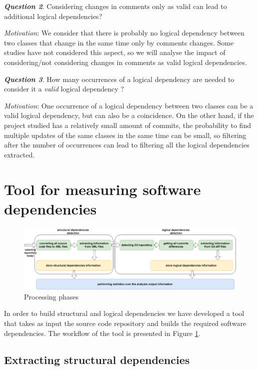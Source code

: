 \documentclass[conference]{IEEEtran}
\begin{document}
\textit{\textbf{Question 2}}. Considering changes in comments only as valid can lead to additional logical dependencies?

\textit{Motivation}: We consider that there is probably no logical dependency between two classes that change in the same time only by comments changes. Some studies have not considered this aspect, so we will analyse the impact of considering/not considering changes in comments as valid logical dependencies.

\textit{\textbf{Question 3}}. How many occurrences of a logical dependency are needed to consider it a \textit{valid} logical dependency ? 

\textit{Motivation}: One occurrence of a logical dependency between two classes can be a valid logical dependency, but can also be a coincidence. On the other hand, if the project studied has a relatively small amount of commits, the probability to find multiple updates of the same classes in the same time can be small, so filtering after the number of occurrences can lead to filtering all the logical dependencies extracted. 

\section{Tool for measuring software dependencies}
\label{sec:tool}

\begin{figure}[htb]
\centering
\includegraphics[width=\textwidth]{fig3.png}
\caption{Processing phases}
\label{fig:fig3}
\end{figure}

In order to build structural and logical dependencies we have developed a tool that takes as input the source code repository and builds the required software dependencies. The workflow of the tool is presented in Figure \ref{fig:fig3}.




\subsection{ Extracting structural dependencies}
\end{document}

